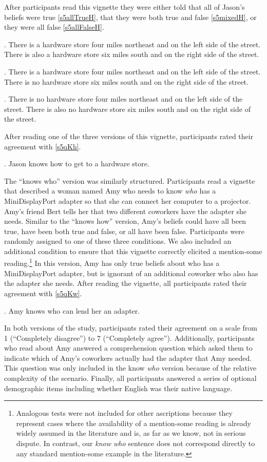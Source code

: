 \documentclass[a4paper]{article}
\begin{document}
After participants read this vignette they were either told that all of Jason's beliefs were true \ref{s5allTrueH}, that they were both true and false \ref{s5mixedH}, or they were all false \ref{s5allFalseH}.

\ex. \label{s5allTrueH} There is a hardware store four miles northeast and on the left side of the street. There is also a hardware store six miles south and on the right side of the street.

\ex. \label{s5mixedH} There is a hardware store four miles northeast and on the left side of the street. There is no hardware store six miles south and on the right side of the street.

\ex. \label{s5allFalseH} There is no hardware store four miles northeast and on the left side of the street. There is also no hardware store six miles south and on the right side of the street.

After reading one of the three versions of this vignette, participants rated their agreement with \ref{s5qKh}.

\ex. \label{s5qKh} Jason knows how to get to a hardware store. 

The ``knows who'' version was similarly structured. Participants read a vignette that described a woman named Amy who needs to know \emph{who} has a MiniDisplayPort adapter so that she can connect her computer to a projector. Amy's friend Bert tells her that two different coworkers have the adapter she needs. Similar to the ``knows how'' version, Amy's beliefs could have all been true, have been both true and false, or all have been false. Participants were randomly assigned to one of these three conditions. We also included an additional condition to ensure that this vignette correctly elicited a mention-some reading.\footnote{Analogous tests were not included for other ascriptions because they represent cases where the availability of a mention-some reading is already widely assumed in the literature and is, as far as we know, not in serious dispute. In contrast, our \emph{know who} sentence does not correspond directly to any standard mention-some example in the literature.} In this version, Amy has only true beliefs about who has a MiniDisplayPort adapter, but is ignorant of an additional coworker who also has the adapter she needs. After reading the vignette, all participants rated their agreement with \ref{s5qKw}. 


\ex. \label{s5qKw} Amy knows who can lend her an adapter. 

In both versions of the study, participants rated their agreement on a scale from 1 (``Completely disagree'') to 7 (``Completely agree''). Additionally, participants who read about Amy answered a comprehension question which asked them to indicate which of Amy's coworkers actually had the adapter that Amy needed. This question was only included in the know \textit{who} version because of the relative complexity of the scenario. Finally, all participants answered a series of optional demographic items including whether English was their native language.
\end{document}
